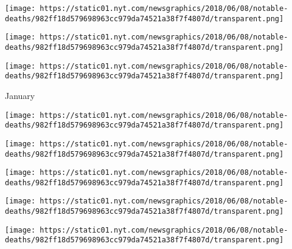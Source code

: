 \texttt{[image: https://static01.nyt.com/newsgraphics/2018/06/08/notable-deaths/982ff18d579698963cc979da74521a38f7f4807d/transparent.png]}

\href{https://www.nytimes.com/2018/02/02/business/jon-huntsman-sr-dies.html}{}

\texttt{[image: https://static01.nyt.com/newsgraphics/2018/06/08/notable-deaths/982ff18d579698963cc979da74521a38f7f4807d/transparent.png]}

\href{https://www.nytimes.com/2018/02/01/obituaries/nicholas-von-hoffman-provocative-journalist-and-author-dies-at-88.html}{}

\texttt{[image: https://static01.nyt.com/newsgraphics/2018/06/08/notable-deaths/982ff18d579698963cc979da74521a38f7f4807d/transparent.png]}

January

\href{https://www.nytimes.com/2018/01/31/obituaries/oscar-gamble-power-hitter-with-prodigious-hair-dies-at-68.html}{}

\texttt{[image: https://static01.nyt.com/newsgraphics/2018/06/08/notable-deaths/982ff18d579698963cc979da74521a38f7f4807d/transparent.png]}

\href{https://www.nytimes.com/2018/01/29/obituaries/arno-motulsky-dies-medical-genetics-founder.html}{}

\texttt{[image: https://static01.nyt.com/newsgraphics/2018/06/08/notable-deaths/982ff18d579698963cc979da74521a38f7f4807d/transparent.png]}

\href{https://www.nytimes.com/2018/01/28/obituaries/ingvar-kamprad-dies.html}{}

\texttt{[image: https://static01.nyt.com/newsgraphics/2018/06/08/notable-deaths/982ff18d579698963cc979da74521a38f7f4807d/transparent.png]}

\href{https://www.nytimes.com/2018/01/25/obituaries/warren-miller-ski-bum-turned-filmmaker-is-dead-at-93.html}{}

\texttt{[image: https://static01.nyt.com/newsgraphics/2018/06/08/notable-deaths/982ff18d579698963cc979da74521a38f7f4807d/transparent.png]}

\href{https://www.nytimes.com/2018/01/23/obituaries/ursula-k-le-guin-acclaimed-for-her-fantasy-fiction-is-dead-at-88.html}{}

\texttt{[image: https://static01.nyt.com/newsgraphics/2018/06/08/notable-deaths/982ff18d579698963cc979da74521a38f7f4807d/transparent.png]}

\href{https://www.nytimes.com/2018/01/23/obituaries/hugh-masekela-dies.html}{}


